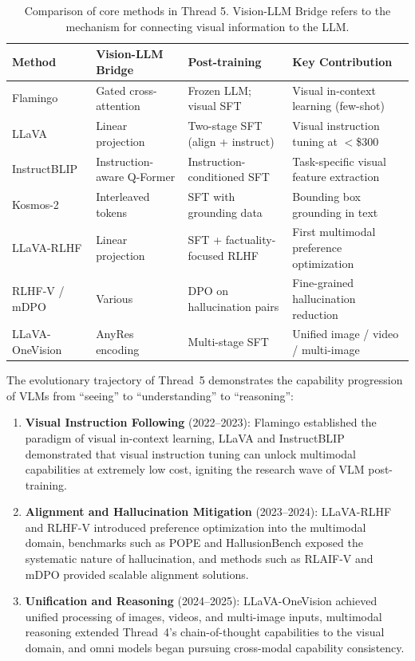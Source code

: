 \begin{table}[!ht]
\centering
\caption{Comparison of core methods in Thread 5. Vision-LLM Bridge refers to the mechanism for connecting visual information to the LLM.}
\label{tab:multimodal-comparison}
\small
\begin{tabularx}{\textwidth}{l >{\raggedright\arraybackslash}p{2.5cm} >{\raggedright\arraybackslash}p{2.5cm} >{\raggedright\arraybackslash}X}
\toprule
\textbf{Method} & \textbf{Vision-LLM Bridge} & \textbf{Post-training} & \textbf{Key Contribution} \\
\midrule
Flamingo & Gated cross-attention & Frozen LLM; visual SFT & Visual in-context learning (few-shot) \\
LLaVA & Linear projection & Two-stage SFT (align + instruct) & Visual instruction tuning at $<$\$300 \\
InstructBLIP & Instruction-aware Q-Former & Instruction-conditioned SFT & Task-specific visual feature extraction \\
Kosmos-2 & Interleaved tokens & SFT with grounding data & Bounding box grounding in text \\
LLaVA-RLHF & Linear projection & SFT + factuality-focused RLHF & First multimodal preference optimization \\
RLHF-V / mDPO & Various & DPO on hallucination pairs & Fine-grained hallucination reduction \\
LLaVA-OneVision & AnyRes encoding & Multi-stage SFT & Unified image / video / multi-image \\
\bottomrule
\end{tabularx}
\end{table}

The evolutionary trajectory of Thread~5 demonstrates the capability progression of VLMs from ``seeing'' to ``understanding'' to ``reasoning'':

\begin{enumerate}[leftmargin=2em]
  \item \textbf{Visual Instruction Following} (2022--2023):
    Flamingo established the paradigm of visual in-context learning,
    LLaVA and InstructBLIP demonstrated that visual instruction tuning
    can unlock multimodal capabilities at extremely low cost,
    igniting the research wave of VLM post-training.

  \item \textbf{Alignment and Hallucination Mitigation} (2023--2024):
    LLaVA-RLHF and RLHF-V introduced preference optimization into the multimodal domain,
    benchmarks such as POPE and HallusionBench exposed the systematic nature of hallucination,
    and methods such as RLAIF-V and mDPO provided scalable alignment solutions.

  \item \textbf{Unification and Reasoning} (2024--2025):
    LLaVA-OneVision achieved unified processing of images, videos, and multi-image inputs,
    multimodal reasoning extended Thread~4's chain-of-thought capabilities to the visual domain,
    and omni models began pursuing cross-modal capability consistency.
\end{enumerate}

